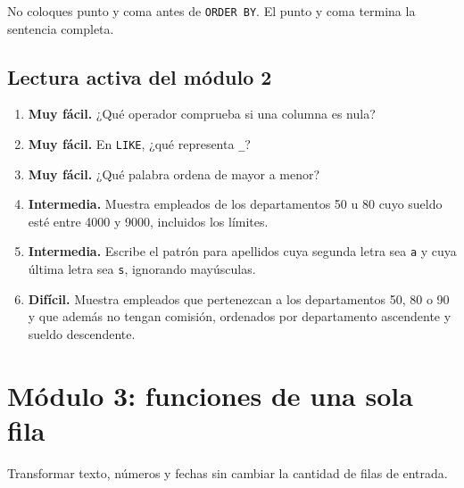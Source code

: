 \documentclass[11pt,a4paper]{article}
\newcommand{\campo}[1]{\texttt{#1}}
\newcommand{\nivel}[1]{\textbf{#1}}
\begin{document}
\begin{errorbox}
No coloques punto y coma antes de \campo{ORDER BY}. El punto y coma termina la sentencia completa.
\end{errorbox}

\subsection{Lectura activa del módulo 2}

\begin{enumerate}[label=\textbf{M2.\arabic*}]
  \item \nivel{Muy fácil.} ¿Qué operador comprueba si una columna es nula?
  \item \nivel{Muy fácil.} En \campo{LIKE}, ¿qué representa \campo{\_}?
  \item \nivel{Muy fácil.} ¿Qué palabra ordena de mayor a menor?
  \item \nivel{Intermedia.} Muestra empleados de los departamentos 50 u 80 cuyo sueldo esté entre
  4000 y 9000, incluidos los límites.
  \item \nivel{Intermedia.} Escribe el patrón para apellidos cuya segunda letra sea \campo{a} y cuya
  última letra sea \campo{s}, ignorando mayúsculas.
  \item \nivel{Difícil.} Muestra empleados que pertenezcan a los departamentos 50, 80 o 90 y que
  además no tengan comisión, ordenados por departamento ascendente y sueldo descendente.
\end{enumerate}

\section{Módulo 3: funciones de una sola fila}

\begin{objetivo}
Transformar texto, números y fechas sin cambiar la cantidad de filas de entrada.
\end{objetivo}
\end{document}
